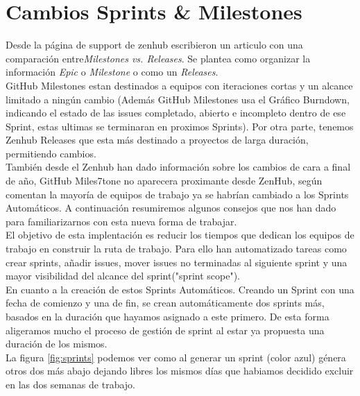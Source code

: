 \documentclass[11pt]{article}
\begin{document}
\section*{\textbf{Cambios Sprints \& Milestones} } %
Desde la página de support de zenhub escribieron un articulo con una comparación entre\textit{Milestones vs. Releases}. Se plantea como organizar la información \textit{Epic} o \textit{Milestone} o como un \textit{Releases}.\\

GitHub Milestones estan destinados a equipos con iteraciones cortas y un alcance limitado a ningún cambio (Además GitHub Milestones usa el Gráfico Burndown, indicando el estado de las issues completado, abierto e incompleto dentro de ese Sprint, estas ultimas se terminaran en proximos Sprints). Por otra parte, tenemos Zenhub Releases que esta más destinado a proyectos de larga duración, permitiendo cambios.\\

También desde el Zenhub han dado información sobre los cambios de cara a final de año, GitHub Miles7tone no aparecera proximante desde ZenHub, según comentan la mayoría de equipos de trabajo ya se habrían cambiado a los Sprints Automáticos. A continuación resumiremos algunos consejos que nos han dado para familiarizarnos con esta nueva forma de trabajar.\\

El objetivo de esta implentación es reducir los tiempos que dedican los equipos de trabajo en construir la ruta de trabajo. Para ello han automatizado tareas como crear sprints, añadir issues, mover issues no terminadas al siguiente sprint y una mayor visibilidad del alcance del sprint("sprint scope").\\

En cuanto a la creación de estos Sprints Automáticos. Creando un Sprint con una fecha de comienzo y una de fin, se crean automáticamente dos sprints más, basados en la duración que hayamos asignado a este primero. De esta forma aligeramos mucho el proceso de gestión de sprint al estar ya propuesta una duración de los mismos. \cite{Sprint_planning}\\


La figura \ref{fig:sprints} podemos ver como al generar un sprint (color azul) génera otros dos más abajo dejando libres los mismos días que habiamos decidido excluir en las dos semanas de trabajo.
\end{document}
